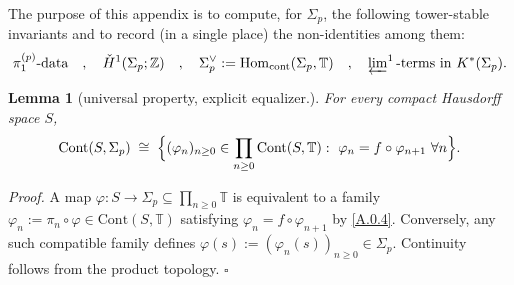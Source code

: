 \documentclass[11pt]{article}
\newtheorem{lemma}[theorem]{Lemma}
\theoremstyle{remark}
\begin{document}
The purpose of this appendix is to compute, for $\Sigma_{p}$, the following tower-stable invariants and to record (in a single place) the non-identities among them:
\begin{equation}
\pi_1^{(p)}\text{-data}\quad,\quad
\check H^{1}(\Sigma_{p};\mathbb Z)\quad,\quad
\Sigma_{p}^{\vee}:=\mathrm{Hom}_{\mathrm{cont}}(\Sigma_{p},\mathbb T)\quad,\quad
\varprojlim\nolimits^{1}\text{-terms in }K^{*}(\Sigma_{p}).
\label{A.0.6}
\end{equation} 
\begin{lemma}[universal property, explicit equalizer.]
For every compact Hausdorff space $S$,
\begin{equation}
\mathrm{Cont}(S,\Sigma_{p})
\;\cong\;
\Bigl\{(\varphi_{n})_{n\ge 0}\in\prod_{n\ge 0}\mathrm{Cont}(S,\mathbb T):\ \varphi_{n}=f\circ \varphi_{n+1}\ \forall n\Bigr\}.
\label{A.1.1}
\end{equation}
\end{lemma}
\noindent\textit{Proof.}
A map $\varphi:S\to\Sigma_{p}\subseteq\prod_{n\ge 0}\mathbb T$ is equivalent to a family
$\varphi_{n}:=\pi_{n}\circ\varphi\in\mathrm{Cont}(S,\mathbb T)$
satisfying $\varphi_{n}=f\circ\varphi_{n+1}$ by \eqref{A.0.4}.
Conversely, any such compatible family defines $\varphi(s):=(\varphi_{n}(s))_{n\ge 0}\in\Sigma_{p}$.
Continuity follows from the product topology. \hfill$\square$

\medskip
\end{document}
